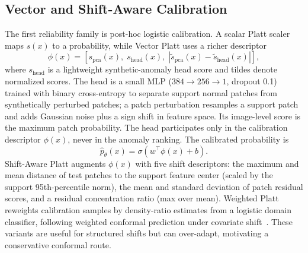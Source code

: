\subsection{Vector and Shift-Aware Calibration}
The first reliability family is post-hoc logistic calibration. A scalar Platt scaler maps $s(x)$ to a probability, while Vector Platt uses a richer descriptor
\begin{equation}\label{eq:phi}
    \phi(x)=\left[s_{\mathrm{pca}}(x),\; s_{\mathrm{head}}(x),\; |\tilde{s}_{\mathrm{pca}}(x)-\tilde{s}_{\mathrm{head}}(x)|\right],
\end{equation}
where $s_{\mathrm{head}}$ is a lightweight synthetic-anomaly head score and tildes denote normalized scores. The head is a small MLP ($384{\to}256{\to}1$, dropout 0.1) trained with binary cross-entropy to separate support normal patches from synthetically perturbed patches; a patch perturbation resamples a support patch and adds Gaussian noise plus a sign shift in feature space. Its image-level score is the maximum patch probability. The head participates only in the calibration descriptor $\phi(x)$, never in the anomaly ranking. The calibrated probability is
\begin{equation}\label{eq:platt}
    \hat{p}_{\theta}(x)=\sigma(w^{\top}\phi(x)+b).
\end{equation}
Shift-Aware Platt augments $\phi(x)$ with five shift descriptors: the maximum and mean distance of test patches to the support feature center (scaled by the support 95th-percentile norm), the mean and standard deviation of patch residual scores, and a residual concentration ratio (max over mean). Weighted Platt reweights calibration samples by density-ratio estimates from a logistic domain classifier, following weighted conformal prediction under covariate shift~\cite{tibshirani2019covariate}. These variants are useful for structured shifts but can over-adapt, motivating a conservative conformal route.

